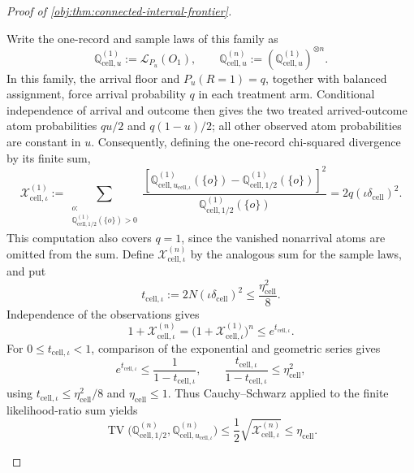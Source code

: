 \begin{proof}[Proof of \cref{obj:thm:connected-interval-frontier}]
\begin{enumerate}
Write the one-record and sample laws of this family as
\[
\mathbb Q_{\mathrm{cell},u}^{(1)}:=\mathcal L_{P_u}(O_1),
\qquad
\mathbb Q_{\mathrm{cell},u}^{(n)}
:=(\mathbb Q_{\mathrm{cell},u}^{(1)})^{\otimes n}.
\]
In this family, the arrival floor and \(P_u(R=1)=q\), together with
balanced assignment, force arrival probability \(q\) in each treatment
arm. Conditional independence of arrival and outcome then gives the
two treated arrived-outcome atom probabilities \(qu/2\) and
\(q(1-u)/2\); all other observed atom probabilities are constant in \(u\).
Consequently, defining the one-record chi-squared divergence by its
finite sum,
\[
\mathcal X_{\mathrm{cell},\iota}^{(1)}
:=
\sum_{\substack{o:\\
\mathbb Q_{\mathrm{cell},1/2}^{(1)}(\{o\})>0}}
\frac{
\left[
\mathbb Q_{\mathrm{cell},u_{\mathrm{cell},\iota}}^{(1)}(\{o\})
-\mathbb Q_{\mathrm{cell},1/2}^{(1)}(\{o\})
\right]^2}
{\mathbb Q_{\mathrm{cell},1/2}^{(1)}(\{o\})}
=
2q(\iota\delta_{\mathrm{cell}})^2.
\]
This computation also covers \(q=1\), since the vanished nonarrival
atoms are omitted from the sum. Define
\(\mathcal X_{\mathrm{cell},\iota}^{(n)}\) by the analogous sum for the
sample laws, and put
\[
t_{\mathrm{cell},\iota}
:=2N(\iota\delta_{\mathrm{cell}})^2
\le\frac{\eta_{\mathrm{cell}}^2}{8}.
\]
Independence of the observations gives
\[
1+\mathcal X_{\mathrm{cell},\iota}^{(n)}
=
\bigl(1+\mathcal X_{\mathrm{cell},\iota}^{(1)}\bigr)^n
\le e^{t_{\mathrm{cell},\iota}}.
\]
For \(0\le t_{\mathrm{cell},\iota}<1\), comparison of the exponential
and geometric series gives
\[
e^{t_{\mathrm{cell},\iota}}
\le\frac1{1-t_{\mathrm{cell},\iota}},
\qquad
\frac{t_{\mathrm{cell},\iota}}{1-t_{\mathrm{cell},\iota}}
\le\eta_{\mathrm{cell}}^2,
\]
using \(t_{\mathrm{cell},\iota}\le\eta_{\mathrm{cell}}^2/8\) and
\(\eta_{\mathrm{cell}}\le1\). Thus Cauchy--Schwarz applied to the
finite likelihood-ratio sum yields
\[
\operatorname{TV}
\bigl(\mathbb Q_{\mathrm{cell},1/2}^{(n)},
      \mathbb Q_{\mathrm{cell},u_{\mathrm{cell},\iota}}^{(n)}\bigr)
\le\frac12\sqrt{\mathcal X_{\mathrm{cell},\iota}^{(n)}}
\le\eta_{\mathrm{cell}}.
\]


\end{enumerate}
\end{proof}
